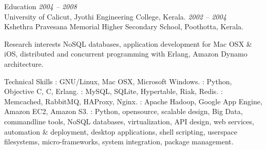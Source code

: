 \documentclass{resume}
\author{Sreejith Kesavan}
\begin{document}
\maketitle


\begin{category}{Education}
   \hfill {\em 2004 -- 2008}\\
  University of Calicut, Jyothi Engineering College, Kerala.
   \hfill {\em 2002 -- 2004}\\
  Kshethra Pravesana Memorial Higher Secondary School, Poothotta, Kerala.
\end{category}


\begin{category}{Research interests}
  \citemnobullet NoSQL databases, application development for Mac OSX \& iOS, 
  distributed and concurrent programming with Erlang, Amazon Dynamo architecture.
\end{category}

\begin{category}{Technical Skills}
  : GNU/Linux, Mac OSX, Microsoft Windows.
  : Python, Objective C, C, Erlang.
  : MySQL, SQLite, Hypertable, Riak, Redis.
  : Memcached, RabbitMQ, HAProxy, Nginx.
  : Apache Hadoop, Google App Engine, Amazon EC2, Amazon S3.
  : Python, opensource, scalable design, Big Data, commandline tools, 
  NoSQL databases, virtualization, API design, web services, automation \& deployment, desktop applications, 
  shell scripting, userspace filesystems, micro-frameworks, system integration, package management.
\end{category}

\end{document}
